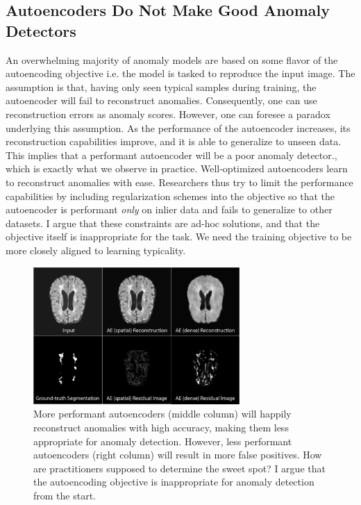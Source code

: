 \subsection*{Autoencoders Do Not Make Good Anomaly Detectors}
An overwhelming majority of anomaly models are based on some flavor of the autoencoding objective \cite{baur_deep_2019,baur2021,tschuchnig_anomaly_2022,kascenas2023} i.e. the model is tasked to reproduce the input image. The assumption is that, having only seen typical samples during training, the autoencoder will fail to reconstruct anomalies. Consequently, one can use reconstruction errors as anomaly scores. However, one can foresee a paradox underlying this assumption. As the performance of the autoencoder increases, its reconstruction capabilities improve, and it is able to generalize to unseen data. This implies that a performant autoencoder will be a poor anomaly detector., which is exactly what we observe in practice. Well-optimized autoencoders learn to reconstruct anomalies with ease. Researchers thus try to limit the performance capabilities by including regularization schemes into the objective so that the autoencoder is performant \textit{only} on inlier data and fails to generalize to other datasets. I argue that these constraints are ad-hoc solutions, and that the objective itself is inappropriate for the task. We need the training objective to be more closely aligned to learning typicality. 

\begin{figure}[tbhp]
\centering
    \centering
    \includegraphics[width=0.7\textwidth]{figures/ae_failure.jpg}
    \caption{More performant autoencoders (middle column) will happily reconstruct anomalies with high accuracy, making them less appropriate for anomaly detection. However, less performant autoencoders (right column) will result in more false positives. How are practitioners supposed to determine the sweet spot? I argue that the autoencoding objective is inappropriate for anomaly detection from the start.}
    \label{fig:ae_failure}
\end{figure}%


